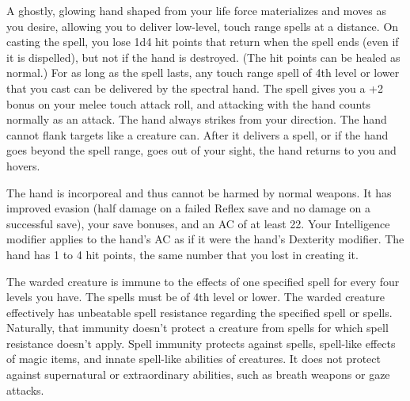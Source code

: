 \begin{multicols}{2}
\begin{small}
\noindent A ghostly, glowing hand shaped from your life force materializes and moves as you desire, allowing you to deliver low-level, touch range spells at a distance. On casting the spell, you lose 1d4 hit points that return when the spell ends (even if it is dispelled), but not if the hand is destroyed. (The hit points can be healed as normal.) For as long as the spell lasts, any touch range spell of 4th level or lower that you cast can be delivered by the spectral hand. The spell gives you a +2 bonus on your melee touch attack roll, and attacking with the hand counts normally as an attack. The hand always strikes from your direction. The hand cannot flank targets like a creature can. After it delivers a spell, or if the hand goes beyond the spell range, goes out of your sight, the hand returns to you and hovers.

\smallskip\noindent The hand is incorporeal and thus cannot be harmed by normal weapons. It has improved evasion (half damage on a failed Reflex save and no damage on a successful save), your save bonuses, and an AC of at least 22. Your Intelligence modifier applies to the hand's AC as if it were the hand's Dexterity modifier. The hand has 1 to 4 hit points, the same number that you lost in creating it.

\noindent The warded creature is immune to the effects of one specified spell for every four levels you have. The spells must be of 4th level or lower. The warded creature effectively has unbeatable spell resistance regarding the specified spell or spells. Naturally, that immunity doesn't protect a creature from spells for which spell resistance doesn't apply. Spell immunity protects against spells, spell-like effects of magic items, and innate spell-like abilities of creatures. It does not protect against supernatural or extraordinary abilities, such as breath weapons or gaze attacks.


\end{small}
\end{multicols}
